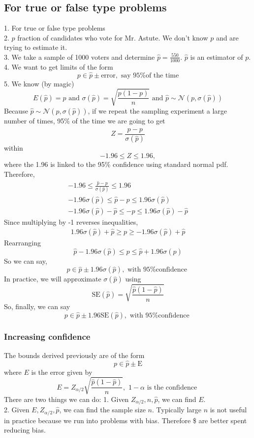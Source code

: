 \documentclass{article}
\newcommand{\beq}{\begin{equation}}
\newcommand{\eeq}{\end{equation}}
\newcommand{\ber}{\begin{eqnarray}}
\newcommand{\eer}{\end{eqnarray}}
\begin{document}
\subsection{For true or false type problems}
1. For true or false type problems\\
2. $p$ fraction of candidates who vote for Mr. Astute. We don't know $p$ and are trying to estimate it.\\
3. We take a sample of 1000 voters and determine $\hat{p}=\frac{550}{1000}$. $\hat{p}$ is an estimator of $p$.
4. We want to get limits  of the form
\beq
p \in \hat{p} \pm \text{error} , \text{ say 95\% of the time}
\eeq
5. We know (by magic)
\beq
E(\hat{p}) = p \text{ and } \sigma(\hat{p}) = \sqrt{\frac{p(1-p)}{n}} \text{ and } \hat{p} \sim \mathcal{N}(p,\sigma(\hat{p}))
\eeq
Because $\hat{p} \sim \mathcal{N}(p,\sigma(\hat{p}))$, if we repeat the sampling experiment a large number of times, 95\% of the time we are going to get 
\beq
Z = \frac{\hat{p}-p}{\sigma(\hat{p})}
\eeq
within
\beq
-1.96 \le Z \le 1.96,
\eeq
where the 1.96 is linked to the 95\% confidence using standard normal pdf. Therefore,
\ber
-1.96 \le \frac{\hat{p}-p}{\sigma(\hat{p})} \le 1.96 \\
-1.96\sigma(\hat{p}) \le \hat{p}-p \le 1.96\sigma(\hat{p}) \\
-1.96\sigma(\hat{p}) - \hat{p}\le -p \le 1.96\sigma(\hat{p}) - \hat{p}
\eer
Since multiplying by -1 reverses inequalities,
\ber
1.96\sigma(\hat{p}) + \hat{p} \ge p \ge -1.96\sigma(\hat{p}) + \hat{p} 
\eer
Rearranging
\beq
\hat{p} -1.96\sigma(\hat{p}) \le p \le \hat{p} + 1.96\sigma(\hat{p})
\eeq
So we can say,
\beq
p \in \hat{p} \pm 1.96\sigma(\hat{p}), \text{ with 95\% confidence }
\eeq
In practice, we will approximate $\sigma(\hat{p})$ using
\beq
\text{SE}(\hat{p}) = \sqrt{\frac{\hat{p}(1-\hat{p})}{n}}
\eeq
So, finally, we can say
\beq
p \in \hat{p} \pm 1.96\text{SE}(\hat{p}), \text{ with 95\% confidence }
\eeq
\subsubsection{Increasing confidence}
The bounds derived previously are of the form
\beq
p \in \hat{p} \pm \text{E}
\eeq
where $E$ is the error given by
\beq
E = Z_{\alpha/2}\sqrt{\frac{\hat{p}(1-\hat{p})}{n}}, \,\, 1-\alpha \text{ is the confidence }
\eeq
There are two things we can do:
1. Given $Z_{\alpha/2},n,\hat{p}$, we can find $E$.\\
2. Given $E,Z_{\alpha/2},\hat{p}$, we can find the sample size $n$.
Typically large $n$ is not useful in practice because we run into problems with bias. Therefore \$ are better spent reducing bias.
\end{document}
